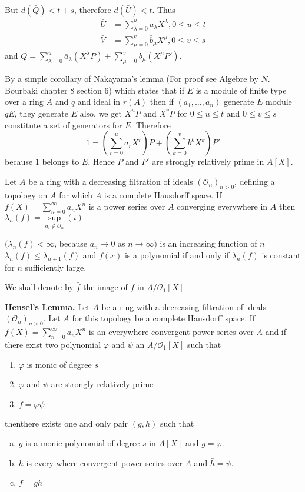 But $d(\bar{Q})< t+s$, therefore $d(\bar{U})<t$. Thus
\begin{align*}
  \bar{U} & = \sum_{\lambda =0}^{u}\bar{a}_{\lambda}X^{\lambda}, 0\leq u \leq t\\
  \bar{V} & = \sum_{\mu =0}^{v} \bar{b}_{\mu}X^{\mu}, 0 \leq v \leq s
\end{align*} 
and $\bar{Q} = \sum\limits_{\lambda=0}^{u}
\bar{a}_{\lambda}(X^{\lambda} \bar{P}) + \sum\limits_{\mu =0}^{v}
\bar{b}_{\mu} (X^{\mu}\bar{P}')$. 
 
By a simple corollary of Nakayama's lemma (For proof see Algebre by
$N$. Bourbaki chapter $8$ section $6$) which states that if $E$ is a\pageoriginale
module of finite type over a ring $A$ and $q$ and ideal in $r(A)$ then
if $(a_1,\ldots , a_n)$ generate $E$ module $qE$, they generate $E$ also, we
get $X^u P$ and $X^v P$ for $0 \leq u \leq t$ and $0 \leq v \leq s$ constitute a
set of generators for $E$. Therefore 
$$
1=\left(\sum_{r= 0}^{u} a_r X^r\right) P+ \left(\sum_{k= 0}^{v} b^k X^k\right) P'
$$
 because $1$ belongs to $E$. Hence $P$ and $P'$ are strongly
 relatively prime in $A[X]$. 
 
 Let $A$ be a ring with a decreasing filtration of ideals
 $(\mathscr{O}_n)_{n>0}$, defining a topology on $A$ for which $A$ is
 a complete Hausdorff space. If $f(X) = \sum\limits_{n=0}^{\infty} a_n
 X^n$ is a power series over $A$ converging everywhere in $A$ then
 $\lambda_n (f) = \sup\limits_{a_i \not\in \mathscr{O}_n} (i)$  
 
$(\lambda_n (f) < \infty$, because $a_n \to 0$ as $n\to \infty)$ is an
 increasing function of $n$ \iec  $\lambda_n (f) \leq
 \lambda_{n+1}(f)$ and $f(x)$ is a polynomial if and only if
 $\lambda_n (f)$ is constant for $n$ sufficiently large. 
 
We shall denote by $\bar{f}$ the image of $f$ in $A/ \mathscr{O}_1[X]$.
 
 \medskip
 \noindent
\textbf{Hensel's Lemma.} Let $A$ be a ring with a decreasing
filtration of ideals $(\mathscr{O}_n)_{n>0}$. Let $A$ for this
topology be a complete Hausdorff space. If $f(X) =
\sum\limits_{n=0}^{\infty} a_n X^n$ is an everywhere convergent power
series over $A$ and if there exist two polynomial $\varphi$ and $\psi$
an $A / \mathscr{O}_1[X]$ such that 
\begin{enumerate}[(1)] 
\item $\varphi$ is monic of degree $s$
\item $\varphi$ and $\psi$ are strongly relatively prime
\item $\bar{f}= \varphi \psi$  
 \end{enumerate}
then\pageoriginale there exists one and only pair $(g,h)$ such that 
\begin{enumerate}[(a)]
\item $g$ is a monic polynomial of degree $s$ in $A[X]$ and $\bar{g}=\varphi$.
\item $h$ is every where convergent power series over $A$ and $\bar{h}=\psi$.
\item $f=g h$
\end{enumerate}

